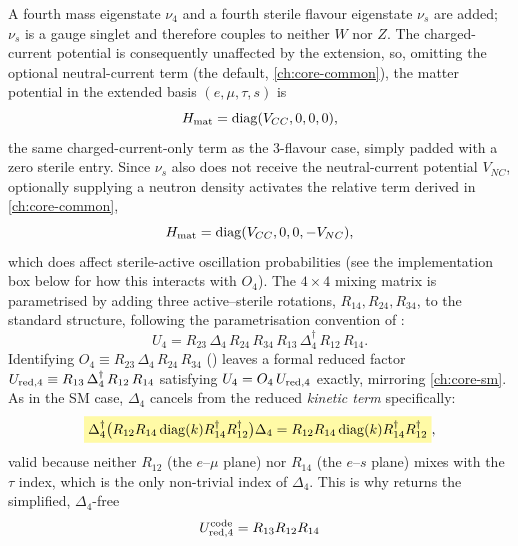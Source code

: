 \begin{theorybox}
A fourth mass eigenstate $\nu_4$ and a fourth sterile flavour eigenstate
$\nu_s$ are added; $\nu_s$ is a gauge singlet and therefore couples to
neither $W$ nor $Z$. The charged-current potential is consequently
unaffected by the extension, so, omitting the optional neutral-current term
(the default, \cref{ch:core-common}), the matter potential in the extended
basis $(e,\mu,\tau,s)$ is
\begin{equation}
  H_{\rm mat}=\operatorname{diag}(V_{CC},0,0,0),
\end{equation}
the same charged-current-only term as the 3-flavour case, simply padded
with a zero sterile entry. Since $\nu_s$ also does not receive the
neutral-current potential $V_{NC}$, optionally supplying a neutron density
activates the relative term derived in \cref{ch:core-common},
\begin{equation}
  H_{\rm mat}=\operatorname{diag}(V_{CC},0,0,-V_{NC}),
\end{equation}
which does affect sterile-active oscillation probabilities (see the
implementation box below for how this interacts with $O_4$). The $4\times4$
mixing matrix is parametrised by adding three active--sterile rotations,
$R_{14},R_{24},R_{34}$, to the standard structure, following the
parametrisation convention of \textcite{KoppMachadoMaltoniSchwetz2013}:
\begin{equation}
  U_4 = R_{23}\,\Delta_4\,R_{24}\,R_{34}\,R_{13}\,\Delta_4^\dagger\,R_{12}\,R_{14}.
\end{equation}
Identifying $O_4\equiv R_{23}\,\Delta_4\,R_{24}\,R_{34}$
() leaves a formal reduced factor
$U_{\rm red,4}\equiv R_{13}\,\Delta_4^\dagger\,R_{12}\,R_{14}$ satisfying
$U_4=O_4\,U_{\rm red,4}$ exactly, mirroring \cref{ch:core-sm}. As in the SM
case, $\Delta_4$ cancels from the reduced \emph{kinetic term} specifically:
\begin{equation}
  \keyresult{\Delta_4^\dagger\bigl(R_{12}R_{14}\diag(k)R_{14}^\dagger R_{12}^\dagger\bigr)\Delta_4
  = R_{12}R_{14}\diag(k)R_{14}^\dagger R_{12}^\dagger},
\end{equation}
valid because neither $R_{12}$ (the $e$--$\mu$ plane) nor $R_{14}$ (the
$e$--$s$ plane) mixes with the $\tau$ index, which is the only non-trivial
index of $\Delta_4$. This is why  returns the
simplified, $\Delta_4$-free
\begin{equation}
  U_{\rm red,4}^{\rm code}=R_{13}R_{12}R_{14}
\end{equation}

\end{theorybox}
